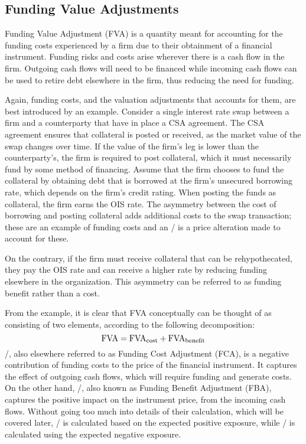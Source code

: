 \documentclass[main.tex]{subfiles}
\begin{document}
    \subsection{Funding Value Adjustments}
        Funding Value Adjustment (FVA) is a quantity meant for accounting for the funding costs 
        experienced by a firm due to their obtainment of a financial instrument.
        Funding risks and costs arise wherever there is a cash flow in the firm. 
        Outgoing cash flows will need to be financed while incoming cash flows
        can be used to retire debt elsewhere in the firm, thus reducing the need for funding.

        Again, funding costs, and the valuation adjustments that accounts for them,
        are best introduced by an example.
        Consider a single interest rate swap between a firm and a counterparty that have in place a CSA agreement.
        The CSA agreement ensures that collateral is posted or received,
        as the market value of the swap changes over time.
        If the value of the firm's leg is lower than the counterparty's,
        the firm is required to post collateral, 
        which it must necessarily fund by some method of financing.
        Assume that the firm chooses to fund the collateral by obtaining debt
        that is borrowed at the firm's unsecured borrowing rate, which depends on the firm's credit rating.
        When posting the funds as collateral, the firm earns the OIS rate.
        The asymmetry between the cost of borrowing and posting collateral
        adds additional costs to the swap transaction; 
        these are an example of funding costs and an \FVA/ is a price alteration made to account for these.

        On the contrary, if the firm must receive collateral that can be rehypothecated,
        they pay the OIS rate and can receive a higher rate
        by reducing funding elsewhere in the organization.
        This asymmetry can be referred to as funding benefit rather than a cost.
        
        From the example, it is clear that FVA conceptually can be thought of 
        as consisting of two elements, according to the following decomposition:
        \begin{equation}
            \FVA/ = \FCA/ + \FBA/
        \end{equation}
        \FCA/, also elsewhere referred to as Funding Cost Adjustment (FCA), 
        is a negative contribution of funding costs to the price of the financial instrument.
        It captures the effect of outgoing cash flows, which will require funding and generate costs.
        On the other hand, \FBA/, also known as Funding Benefit Adjustment (FBA), 
        captures the positive impact on the instrument price, from the incoming cash flows.
        Without going too much into details of their calculation, which will be covered later,
        \FCA/ is calculated based on the expected positive exposure, 
        while \FBA/ is calculated using the expected negative exposure. 
\end{document}
